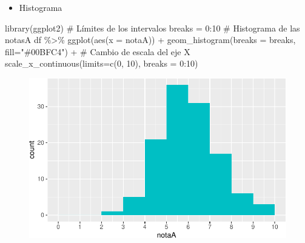 \documentclass[
  a4paper,
]{scrreport}
\newenvironment{Shaded}{\begin{snugshade}}{\end{snugshade}}
\newcommand{\AttributeTok}[1]{\textcolor[rgb]{0.40,0.45,0.13}{#1}}
\newcommand{\CommentTok}[1]{\textcolor[rgb]{0.37,0.37,0.37}{#1}}
\newcommand{\DecValTok}[1]{\textcolor[rgb]{0.68,0.00,0.00}{#1}}
\newcommand{\FunctionTok}[1]{\textcolor[rgb]{0.28,0.35,0.67}{#1}}
\newcommand{\NormalTok}[1]{\textcolor[rgb]{0.00,0.23,0.31}{#1}}
\newcommand{\OtherTok}[1]{\textcolor[rgb]{0.00,0.23,0.31}{#1}}
\newcommand{\SpecialCharTok}[1]{\textcolor[rgb]{0.37,0.37,0.37}{#1}}
\newcommand{\StringTok}[1]{\textcolor[rgb]{0.13,0.47,0.30}{#1}}
\providecommand{\tightlist}{%
  \setlength{\itemsep}{0pt}\setlength{\parskip}{0pt}}\usepackage{longtable,booktabs,array}
\theoremstyle{definition}
\theoremstyle{definition}
\theoremstyle{remark}
\begin{document}
\begin{itemize}
\tightlist
\item
  Histograma
\end{itemize}

\begin{Shaded}
\begin{Highlighting}[]
\FunctionTok{library}\NormalTok{(ggplot2)}
\CommentTok{\# Límites de los intervalos}
\NormalTok{breaks }\OtherTok{=} \DecValTok{0}\SpecialCharTok{:}\DecValTok{10}
\CommentTok{\# Histograma de las notasA}
\NormalTok{df }\SpecialCharTok{\%\textgreater{}\%} \FunctionTok{ggplot}\NormalTok{(}\FunctionTok{aes}\NormalTok{(}\AttributeTok{x =}\NormalTok{ notaA)) }\SpecialCharTok{+} 
  \FunctionTok{geom\_histogram}\NormalTok{(}\AttributeTok{breaks =}\NormalTok{ breaks, }\AttributeTok{fill=}\StringTok{"\#00BFC4"}\NormalTok{) }\SpecialCharTok{+} 
  \CommentTok{\# Cambio de escala del eje X}
  \FunctionTok{scale\_x\_continuous}\NormalTok{(}\AttributeTok{limits=}\FunctionTok{c}\NormalTok{(}\DecValTok{0}\NormalTok{, }\DecValTok{10}\NormalTok{), }\AttributeTok{breaks =} \DecValTok{0}\SpecialCharTok{:}\DecValTok{10}\NormalTok{) }
\end{Highlighting}
\end{Shaded}

\begin{figure}[H]

{\centering \includegraphics{./08-analisis-estadisticos_files/figure-pdf/unnamed-chunk-11-1.pdf}

}

\end{figure}
\end{document}
